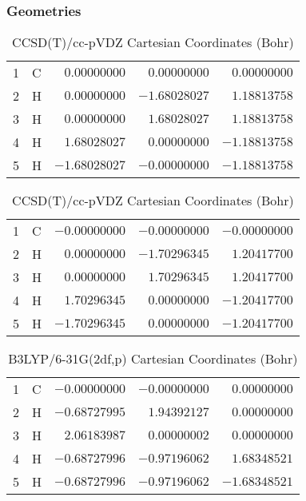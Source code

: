 \documentclass[10pt,oneside]{article}
\begin{document}
\begin{table}[h!]
\subsubsection*{Geometries}
\begin{multicols}{2}
\centering
\caption{CCSD(T)/cc-pVTZ Cartesian Coordinates (Bohr)}
\begin{tabular}{llrrr}
\toprule
1  & C  & $ 0.00000000$ & $ 0.00000000$ & $ 0.00000000$ \\
2  & H  & $ 0.00000000$ & $-1.68028027$ & $ 1.18813758$ \\
3  & H  & $ 0.00000000$ & $ 1.68028027$ & $ 1.18813758$ \\
4  & H  & $ 1.68028027$ & $ 0.00000000$ & $-1.18813758$ \\
5  & H  & $-1.68028027$ & $-0.00000000$ & $-1.18813758$ \\
\bottomrule
\end{tabular}
\caption{CCSD(T)/cc-pVDZ Cartesian Coordinates (Bohr)}
\begin{tabular}{llrrr}
\toprule
1  & C  & $-0.00000000$ & $-0.00000000$ & $-0.00000000$ \\
2  & H  & $ 0.00000000$ & $-1.70296345$ & $ 1.20417700$ \\
3  & H  & $ 0.00000000$ & $ 1.70296345$ & $ 1.20417700$ \\
4  & H  & $ 1.70296345$ & $ 0.00000000$ & $-1.20417700$ \\
5  & H  & $-1.70296345$ & $ 0.00000000$ & $-1.20417700$ \\
\bottomrule
\end{tabular}
\end{multicols}
\end{table}

\begin{table}[h]
\centering
\caption{B3LYP/6-31G(2df,p) Cartesian Coordinates (Bohr)}
\begin{tabular}{llrrr}
\toprule
1  & C  & $-0.00000000$ & $-0.00000000$ & $ 0.00000000$ \\
2  & H  & $-0.68727995$ & $ 1.94392127$ & $ 0.00000000$ \\
3  & H  & $ 2.06183987$ & $ 0.00000002$ & $ 0.00000000$ \\
4  & H  & $-0.68727996$ & $-0.97196062$ & $ 1.68348521$ \\
5  & H  & $-0.68727996$ & $-0.97196062$ & $-1.68348521$ \\
\bottomrule
\end{tabular}
\end{table}
\end{document}
